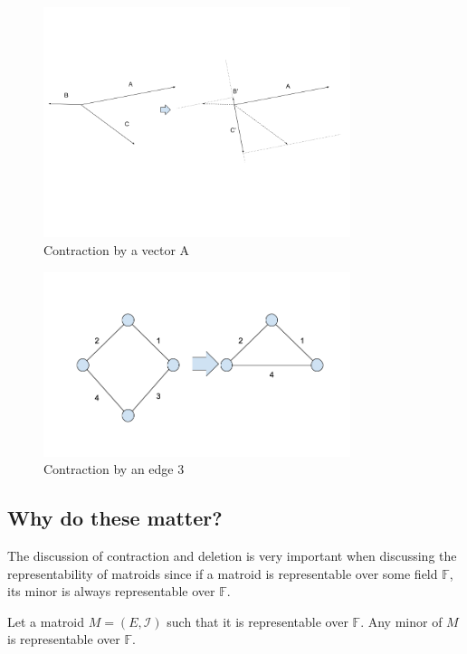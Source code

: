\begin{figure}
  \centering
    \includegraphics[width=0.8\textwidth,natwidth=610,natheight=642]{vectors.png}
    \caption{Contraction by a vector A}
  \label{fig:test}
\end{figure}

\begin{figure}
  \centering
    \includegraphics[width=0.8\textwidth,natwidth=610,natheight=642]{graphs.png}
    \caption{Contraction by an edge 3}
  \label{fig:test}
\end{figure}



\subsection{Why do these matter?}
The discussion of contraction and deletion is very important when discussing the representability of matroids since if a matroid is representable over some field $\mathbb{F}$, its minor is always representable over $\mathbb{F}$.

\begin{thm}
Let a matroid $M = (E, \mathcal{I})$ such that it is representable over $\mathbb{F}$.
Any minor of $M$ is representable over $\mathbb{F}$.
\end{thm}

